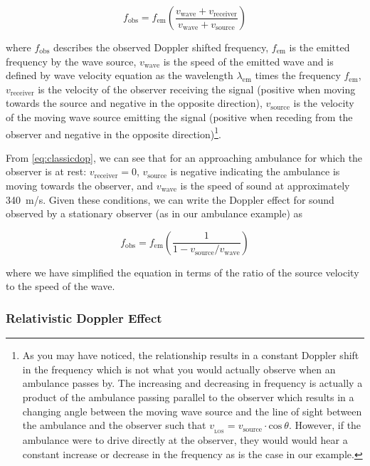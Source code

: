 \begin{equation}f_\text{obs} = f_\text{em} \left (\frac{v_\text{wave} + v_\text{receiver}}{v_\text{wave} + v_\text{source}}  \right )\label{eq:classicdop}\end{equation}

\noindent where \(f_\text{obs}\) describes the observed Doppler shifted
frequency, \(f_\text{em}\) is the emitted frequency by the wave source,
\(v_\text{wave}\) is the speed of the emitted wave and is defined by
wave velocity equation as the wavelength \(\lambda_\text{em}\) times the
frequency \(f_\text{em}\), \(v_\text{receiver}\) is the velocity of the
observer receiving the signal (positive when moving towards the source
and negative in the opposite direction), \(v_\text{source}\) is the
velocity of the moving wave source emitting the signal (positive when
receding from the observer and negative in the opposite
direction)\footnote{As you may have noticed, the relationship results in a constant Doppler shift in the frequency which is not what you would actually observe when an ambulance passes by. The increasing and decreasing in frequency is actually a product of the ambulance passing parallel to the observer which results in a changing angle between the moving wave source and the line of sight between the ambulance and the observer such that $v_{_\text{LOS}} = v_\text{source} \cdot \text{cos}\ \theta$. However, if the ambulance were to drive directly at the observer, they would would hear a constant increase or decrease in the frequency as is the case in our example.}.

From \cref{eq:classicdop}, we can see that for an
approaching ambulance for which the observer is at rest:
\(v_\text{receiver} = 0\), \(v_\text{source}\) is negative indicating
the ambulance is moving towards the observer, and \(v_\text{wave}\) is
the speed of sound at approximately \SI{340}{m/s}. Given these
conditions, we can write the Doppler effect for sound observed by a
stationary observer (as in our ambulance example) as

\begin{equation}f_\text{obs} = f_\text{em} \left (\frac{1}{1 -v_\text{source} / v_\text{wave}}  \right )\label{eq:ambdop}\end{equation}

\noindent where we have simplified the equation in terms of the ratio of
the source velocity to the speed of the wave.

\subsubsection{Relativistic Doppler
Effect}\label{relativistic-doppler-effect}

